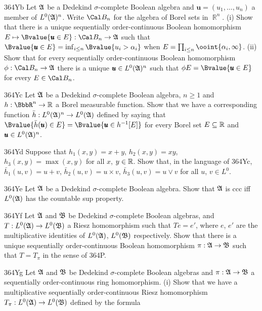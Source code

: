 {\spheader 364Yb Let $\frak A$ be a Dedekind $\sigma$-complete Boolean
algebra and $\pmb{u}=(u_1,\ldots,u_n)$ a member of $L^0(\frak A)^n$.
Write $\Cal B_n$ for the algebra of Borel sets in $\BbbR^n$.
(i) Show that there
is a unique sequentially order-continuous Boolean homomorphism
$E\mapsto\Bvalue{\pmb{u}\in E}:\Cal B_n\to\frak A$ such that
$\Bvalue{\pmb{u}\in E}=\inf_{i\le n}\Bvalue{u_i>\alpha_i}$ when
$E=\prod_{i\le n}\ooint{\alpha_i,\infty}$.
(ii) Show that for every sequentially order-continuous Boolean
homomorphism $\phi:\Cal B_n\to\frak A$ there is a unique
$\pmb{u}\in L^0(\frak A)^n$ such that 
$\phi E=\Bvalue{\pmb{u}\in E}$ for every $E\in\Cal B_n$.

\spheader 364Yc Let $\frak A$ be a Dedekind $\sigma$-complete Boolean
algebra, $n\ge 1$ and $h:\BbbR^n\to\Bbb R$ a Borel measurable function.
Show that we have a corresponding function 
$\bar h:L^0(\frak A)^n\to L^0(\frak A)$ defined by saying that 
$\Bvalue{\bar h(\pmb{u})\in E}
=\Bvalue{\pmb{u}\in h^{-1}[E]}$ for every Borel set
$E\subseteq\Bbb R$ and $\pmb{u}\in L^0(\frak A)^n$.

\spheader 364Yd Suppose that $h_1(x,y)=x+y$, $h_2(x,y)=xy$,
$h_3(x,y)=\max(x,y)$ for all $x$, $y\in\Bbb R$.   Show that, in the
language of 364Yc, $\bar h_1(u,v)=u+v$, $\bar h_2(u,v)=u\times v$, $\bar
h_3(u,v)=u\vee v$ for all $u$, $v\in L^0$.

\spheader 364Ye Let $\frak A$ be a Dedekind $\sigma$-complete Boolean
algebra.   Show that $\frak A$ is ccc iff $L^0(\frak A)$ has the
countable sup property.

\spheader 364Yf Let $\frak A$ and $\frak B$ be Dedekind
$\sigma$-complete Boolean algebras, and $T:L^0(\frak A)\to L^0(\frak B)$
a Riesz homomorphism such that $Te=e'$, where $e$, $e'$
are the multiplicative identities of $L^0(\frak A)$, $L^0(\frak B)$
respectively.   Show that there is a unique sequentially
order-continuous Boolean homomorphism $\pi:\frak A\to\frak B$ such that
$T=T_{\pi}$ in the sense of 364P.   

\spheader 364Yg Let $\frak A$ and $\frak B$ be
Dedekind $\sigma$-complete Boolean algebras
and $\pi:\frak A\to\frak B$ a sequentially order-continuous ring
homomorphism.
(i) Show that we have a multiplicative sequentially order-continuous Riesz
homomorphism $T_{\pi}:L^0(\frak A)\to L^0(\frak B)$ defined by the
formula


}
